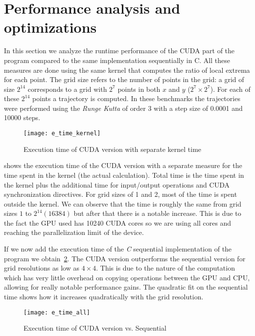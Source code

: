 
\section{Performance analysis and optimizations}


In this section we analyze the runtime performance of the CUDA part of
the program compared to the same implementation sequentially in C. All
these measures are done using the same kernel that computes the ratio
of local extrema for each point. The grid size refers to the number of
points in the grid: a grid of size $2^14$ corresponds to a
grid with $2^7$ points in both $x$ and $y$ ($2^7 \times 2^7$). For each of these
$2^14$ points a trajectory is computed. In these benchmarks the trajectories were
performed using the \emph{Runge Kutta} of order 3 with a step size of 0.0001 and
10000 steps.


\begin{figure}[H]
    \centering
    \texttt{[image: e\_time\_kernel]}
    \caption{Execution time of CUDA version with separate kernel time
    }%
    \label{fig:time_overhead}
\end{figure}

 shows the execution time of the CUDA version with a
separate measure for the time spent in the kernel (the actual calculation). Total
time is the time spent in the kernel plus the additional time for input/output
operations and CUDA synchronization directives. For grid sizes of 1 and 2, most of the
time is spent outside the kernel. We can observe that the time is roughly the same
from grid sizes $1$ to $2^14 (16384)$ but after that there is a notable increase.
This is due to the fact the GPU used has 10240 CUDA cores so
we are using all cores and reaching the parallelization limit of the device.

If we now add the execution time of the \emph{C} sequential implementation of the
program we obtain~\cref{fig:time_cuda}. The CUDA version outperforms the sequential
version for grid resolutions as low as $4\times4$. This is due to the nature of the
computation which has very little overhead on copying operations between the GPU and
CPU, allowing for really notable performance gains. The quadratic fit on the sequential time
shows how it increases quadratically with the grid resolution.

\begin{figure}[H]
    \centering
    \texttt{[image: e\_time\_all]}
    \caption{Execution time of CUDA version vs. Sequential}%
    \label{fig:time_cuda}
\end{figure}

